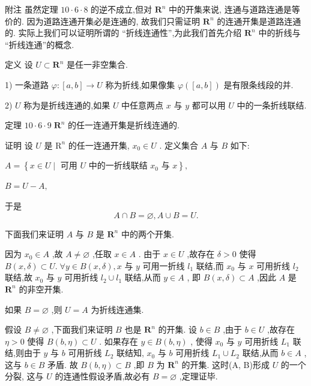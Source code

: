 附注 虽然定理 ${10} \cdot  6 \cdot  8$ 的逆不成立,但对 ${\mathbf{R}}^{n}$ 中的开集来说, 连通与道路连通是等价的. 因为道路连通开集必是连通的, 故我们只需证明 ${\mathbf{R}}^{n}$ 的连通开集是道路连通的. 实际上我们可以证明所谓的 “折线连通性”,为此我们首先介绍 ${\mathbf{R}}^{n}$ 中的折线与 “折线连通”的概念.

定义 设 $U \subset  {\mathbf{R}}^{n}$ 是任一非空集合.

1) 一条道路 $\varphi  : \left\lbrack  {a,b}\right\rbrack   \rightarrow  U$ 称为折线,如果像集 $\varphi \left( \left\lbrack  {a,b}\right\rbrack  \right)$ 是有限条线段的并.

2) $U$ 称为是折线连通的,如果 $U$ 中任意两点 $x$ 与 $y$ 都可以用 $U$ 中的一条折线联结.

定理 ${10} \cdot  6 \cdot  9\;{\mathbf{R}}^{n}$ 的任一连通开集是折线连通的.

证明 设 $U$ 是 ${\mathrm{R}}^{n}$ 的任一连通开集, ${x}_{0} \in  U$ . 定义集合 $A$ 与 $B$ 如下:

$A = \left\{  {x \in  U \mid  \text{ 可用 }U\text{ 中的一折线联结 }{x}_{0}\text{ 与 }x}\right\}  ,$

$B = U - A,$

于是
$$A \cap  B = \varnothing ,A \cup  B = U.$$

下面我们来证明 $A$ 与 $B$ 是 ${\mathbf{R}}^{n}$ 中的两个开集.

因为 ${x}_{0} \in  A$ ,故 $A \neq  \varnothing$ ,任取 $x \in  A$ . 由于 $x \in  U$ ,故存在 $\delta  > 0$ 使得 $B\left( {x,\delta }\right)  \subset  U.\;\forall y \in  B\left( {x,\delta }\right) ,x$ 与 $y$ 可用一折线 ${l}_{1}$ 联结,而 ${x}_{0}$ 与 $x$ 可用折线 ${l}_{2}$ 联结,故 ${x}_{0}$ 与 $y$ 可用折线 ${l}_{2} \cup  {l}_{1}$ 联结,从而 $y \in  A$ , 即 $B\left( {x,\delta }\right)  \subset  A$ ,因此 $A$ 是 ${\mathbf{R}}^{n}$ 的非空开集.

如果 $B = \varnothing$ ,则 $U = A$ 为折线连通集.

假设 $B \neq  \varnothing$ ,下面我们来证明 $B$ 也是 ${\mathbf{R}}^{n}$ 的开集. 设 $b \in  B$ ,由于 $b \in  U$ ,故存在 $\eta  > 0$ 使得 $B\left( {b,\eta }\right)  \subset  U$ . 如果存在 $y \in  B\left( {b,\eta }\right)$ , 使得 ${x}_{0}$ 与 $y$ 可用折线 ${L}_{1}$ 联结,则由于 $y$ 与 $b$ 可用折线 ${L}_{2}$ 联结知, ${x}_{0}$ 与 $b$ 可用折线 ${L}_{1} \cup  {L}_{2}$ 联结,从而 $b \in  A$ ,这与 $b \in  B$ 矛盾. 故 $B\left( {b,\eta }\right)  \subset  B$ ,即 $B$ 为 ${\mathbf{R}}^{n}$ 的开集. 这时(A, B)形成 $U$ 的一个分裂, 这与 $U$ 的连通性假设矛盾,故必有 $B = \varnothing$ ,定理证毕.

